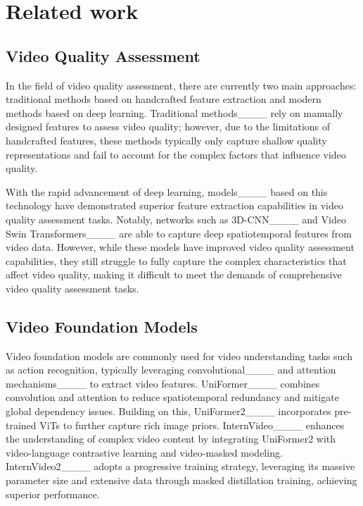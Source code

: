 \section{Related work}
\subsection{Video Quality Assessment}
In the field of video quality assessment, there are currently two main approaches: traditional methods based on handcrafted feature extraction and modern methods based on deep learning. Traditional methods____ rely on manually designed features to assess video quality; however, due to the limitations of handcrafted features, these methods typically only capture shallow quality representations and fail to account for the complex factors that influence video quality.

With the rapid advancement of deep learning, models____ based on this technology have demonstrated superior feature extraction capabilities in video quality assessment tasks. Notably, networks such as 3D-CNN____ and Video Swin Transformers____ are able to capture deep spatiotemporal features from video data. However, while these models have improved video quality assessment capabilities, they still struggle to fully capture the complex characteristics that affect video quality, making it difficult to meet the demands of comprehensive video quality assessment tasks.

\subsection{Video Foundation Models}

Video foundation models are commonly used for video understanding tasks such as action recognition, typically leveraging convolutional____ and attention mechanisms____ to extract video features. UniFormer____ combines convolution and attention to reduce spatiotemporal redundancy and mitigate global dependency issues. Building on this, UniFormer2____ incorporates pre-trained ViTs to further capture rich image priors. InternVideo____ enhances the understanding of complex video content by integrating UniFormer2 with video-language contrastive learning and video-masked modeling. InternVideo2____ adopts a progressive training strategy, leveraging its massive parameter size and extensive data through masked distillation training, achieving superior performance.